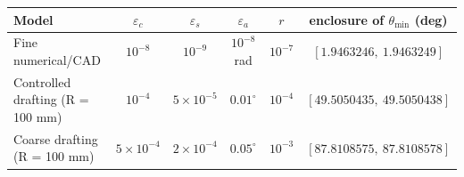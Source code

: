 \begin{tabular}{lcccc c}
\toprule
Model & $\varepsilon_c$ & $\varepsilon_s$ & $\varepsilon_a$ & $r$ & enclosure of $\theta_{\min}$ (deg) \\
\midrule
Fine numerical/CAD & $10^{-8}$ & $10^{-9}$ & $10^{-8}$ rad & $10^{-7}$ & $[1.9463246,\ 1.9463249]$ \\
Controlled drafting (R = 100 mm) & $10^{-4}$ & $5\times10^{-5}$ & $0.01^\circ$ & $10^{-4}$ & $[49.5050435,\ 49.5050438]$ \\
Coarse drafting (R = 100 mm) & $5\times10^{-4}$ & $2\times10^{-4}$ & $0.05^\circ$ & $10^{-3}$ & $[87.8108575,\ 87.8108578]$ \\
\bottomrule
\end{tabular}
